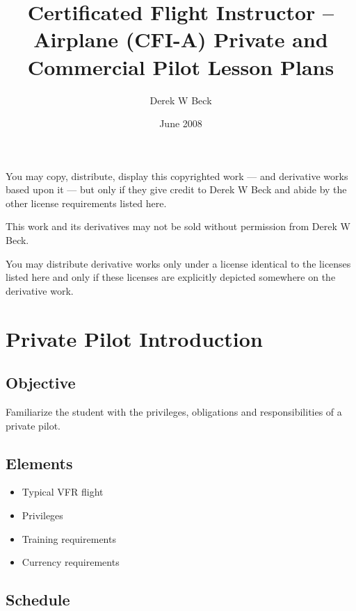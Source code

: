 \documentclass[twoside,openright]{report}
\title{Certificated Flight Instructor – Airplane (CFI-A)
Private and Commercial Pilot Lesson Plans}
\author{Derek W Beck}
\date{June 2008}
\begin{document}
\makeatletter
\begin{titlepage}
  \begin{center}
    \vspace*{1cm}
    \textbf{\@title}

    \vspace*{1cm}
    \@author

    \@date

    \vspace*{2cm}
    \ccby You may copy, distribute, display this copyrighted work — and
    derivative works based upon it — but only if they give credit to Derek W
    Beck and abide by the other license requirements listed here.

    \ccnc This work and its derivatives may not be sold without permission from
    Derek W Beck.

    \ccsa You may distribute derivative works only under a license identical to
    the licenses listed here and only if these licenses are explicitly depicted
    somewhere on the derivative work.
  \end{center}
\end{titlepage}

\setcounter{tocdepth}{0}
\tableofcontents

\chapter{Private Pilot Introduction}

\section{Objective}

Familiarize the student with the privileges, obligations and responsibilities
of a private pilot.

\section{Elements}

\begin{itemize}
  \item Typical VFR flight
  \item Privileges
  \item Training requirements
  \item Currency requirements
\end{itemize}

\section{Schedule}
\end{document}
